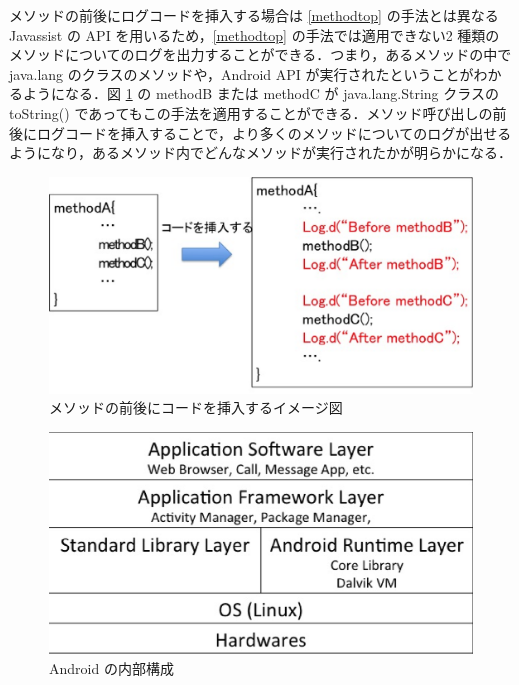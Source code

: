 メソッドの前後にログコードを挿入する場合は \ref{methodtop} の手法とは異なる Javassist の API を用いるため，\ref{methodtop} の手法では適用できない2 種類のメソッドについてのログを出力することができる．つまり，あるメソッドの中で java.lang のクラスのメソッドや，Android API が実行されたということがわかるようになる．図 \ref{insertbetw} の methodB または methodC が java.lang.String  クラスの toString() であってもこの手法を適用することができる．メソッド呼び出しの前後にログコードを挿入することで，より多くのメソッドについてのログが出せるようになり，あるメソッド内でどんなメソッドが実行されたかが明らかになる．

\begin{figure}[t]
\begin{center}
\includegraphics[scale=0.35]{image4.eps}
\end{center}
\caption{メソッドの前後にコードを挿入するイメージ図}
\label{insertbetw}
\end{figure}

\begin{figure}[t]
\begin{center}
\includegraphics[scale=0.5]{structure2.eps}
\end{center}
\caption{Android の内部構成}
\label{structure}
\end{figure}

